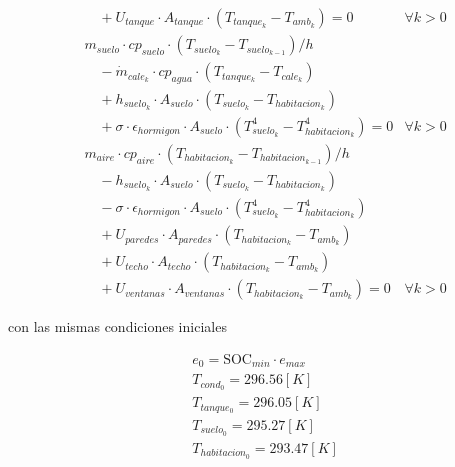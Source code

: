 \begin{align}
	                        & \quad + U_{tanque} \cdot A_{tanque} \cdot (T_{tanque_k} - T_{amb_k}) = 0  \label{eq:sizing_dae2}                 & \forall k > 0 \\
	                        & m_{suelo} \cdot cp_{suelo} \cdot ( T_{suelo_k} - T_{suelo_{k-1}}) / h \nonumber                                                  \\
	                        & \quad - \dot{m}_{cale_k} \cdot cp_{agua} \cdot (T_{tanque_k} - T_{cale_k})                             \nonumber                 \\
	                        & \quad + h_{suelo_k} \cdot A_{suelo} \cdot (T_{suelo_k} - T_{habitacion_k})                             \nonumber                 \\
	                        & \quad + \sigma \cdot \epsilon_{hormigon} \cdot A_{suelo} \cdot (T_{suelo_k}^4 - T_{habitacion_k}^4) = 0          & \forall k > 0 \\
	                        & m_{aire} \cdot cp_{aire} \cdot ( T_{habitacion_k} - T_{habitacion_{k-1}}) / h  \nonumber                                         \\
	                        & \quad - h_{suelo_k} \cdot A_{suelo} \cdot (T_{suelo_k} - T_{habitacion_k})  \nonumber                                            \\
	                        & \quad - \sigma \cdot \epsilon_{hormigon} \cdot A_{suelo} \cdot (T_{suelo_k}^4 - T_{habitacion_k}^4)  \nonumber                   \\
	                        & \quad + U_{paredes} \cdot A_{paredes} \cdot (T_{habitacion_k} - T_{amb_k}) \nonumber                                             \\
	                        & \quad + U_{techo} \cdot A_{techo} \cdot (T_{habitacion_k} - T_{amb_k}) \nonumber                                                 \\
	                        & \quad + U_{ventanas} \cdot A_{ventanas} \cdot (T_{habitacion_k} - T_{amb_k}) = 0                                 & \forall k > 0
\end{align}

con las mismas condiciones iniciales

\begin{align}
	 & e_0 = \text{SOC}_{min} \cdot e_{max} \\
	 & T_{cond_0} = 296.56 [K]              \\
	 & T_{tanque_0} = 296.05[K]             \\
	 & T_{suelo_0} = 295.27[K]              \\
	 & T_{habitacion_0} = 293.47[K]         \\
\end{align}

